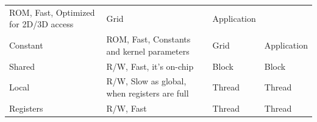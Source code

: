 \documentclass[
  12pt,
  a4paperpaper,
]{report}
\begin{document}
\begin{longtable}[]{@{}llll@{}}
\begin{minipage}[t]{0.53\columnwidth}
ROM, Fast, Optimized for 2D/3D access\strut
\end{minipage} & \begin{minipage}[t]{0.09\columnwidth}\raggedright
Grid\strut
\end{minipage} & \begin{minipage}[t]{0.13\columnwidth}\raggedright
Application\strut
\end{minipage}\tabularnewline
\begin{minipage}[t]{0.13\columnwidth}\raggedright
Constant\strut
\end{minipage} & \begin{minipage}[t]{0.53\columnwidth}\raggedright
ROM, Fast, Constants and kernel parameters\strut
\end{minipage} & \begin{minipage}[t]{0.09\columnwidth}\raggedright
Grid\strut
\end{minipage} & \begin{minipage}[t]{0.13\columnwidth}\raggedright
Application\strut
\end{minipage}\tabularnewline
\begin{minipage}[t]{0.13\columnwidth}\raggedright
Shared\strut
\end{minipage} & \begin{minipage}[t]{0.53\columnwidth}\raggedright
R/W, Fast, it's on-chip\strut
\end{minipage} & \begin{minipage}[t]{0.09\columnwidth}\raggedright
Block\strut
\end{minipage} & \begin{minipage}[t]{0.13\columnwidth}\raggedright
Block\strut
\end{minipage}\tabularnewline
\begin{minipage}[t]{0.13\columnwidth}\raggedright
Local\strut
\end{minipage} & \begin{minipage}[t]{0.53\columnwidth}\raggedright
R/W, Slow as global, when registers are full\strut
\end{minipage} & \begin{minipage}[t]{0.09\columnwidth}\raggedright
Thread\strut
\end{minipage} & \begin{minipage}[t]{0.13\columnwidth}\raggedright
Thread\strut
\end{minipage}\tabularnewline
\begin{minipage}[t]{0.13\columnwidth}\raggedright
Registers\strut
\end{minipage} & \begin{minipage}[t]{0.53\columnwidth}\raggedright
R/W, Fast\strut
\end{minipage} & \begin{minipage}[t]{0.09\columnwidth}\raggedright
Thread\strut
\end{minipage} & \begin{minipage}[t]{0.13\columnwidth}\raggedright
Thread\strut
\end{minipage}\tabularnewline
\bottomrule
\end{longtable}
\end{document}
